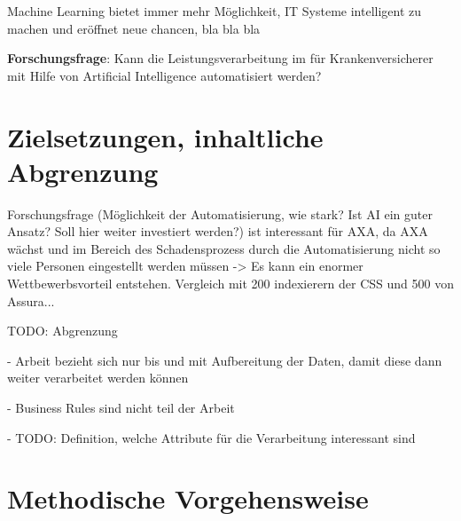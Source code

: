 \documentclass{article}
\begin{document}
Machine Learning bietet immer mehr Möglichkeit, IT Systeme intelligent zu machen und eröffnet neue chancen, bla bla bla

\textbf{Forschungsfrage}: Kann die Leistungsverarbeitung im für Krankenversicherer mit Hilfe von Artificial Intelligence automatisiert werden?

\section{Zielsetzungen, inhaltliche Abgrenzung}


Forschungsfrage (Möglichkeit der Automatisierung, wie stark? Ist AI ein guter Ansatz? Soll hier weiter investiert werden?) ist interessant für AXA, da AXA wächst und im Bereich des Schadensprozess durch die Automatisierung nicht so viele Personen eingestellt werden müssen -> Es kann ein enormer Wettbewerbsvorteil entstehen. Vergleich mit 200 indexierern der CSS und 500 von Assura...

TODO: Abgrenzung

- Arbeit bezieht sich nur bis und mit Aufbereitung der Daten, damit diese dann weiter verarbeitet werden können

- Business Rules sind nicht teil der Arbeit

- TODO: Definition, welche Attribute für die Verarbeitung interessant sind

\section{Methodische Vorgehensweise}

 
\end{document}
